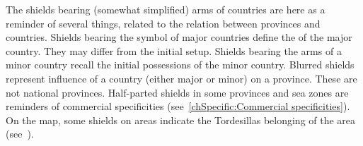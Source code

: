 \aparag[Shields] The shields bearing (somewhat simplified) arms of countries
are here as a reminder of several things, related to the relation between
provinces and countries.
 Shields bearing the symbol of major countries define
the  of the major country. They may differ from the
initial setup.
 Shields bearing the arms of a minor
country recall the initial possessions of the minor country.
\bparag[Influence] Blurred shields represent influence of a country (either
major or minor) on a province. These are not national provinces.
 Half-parted shields in some provinces and sea
zones are reminders of
commercial specificities (see~\ref{chSpecific:Commercial specificities}).
 On the \ROTW map, some shields on areas
indicate the Tordesillas belonging of the area
(see~).

